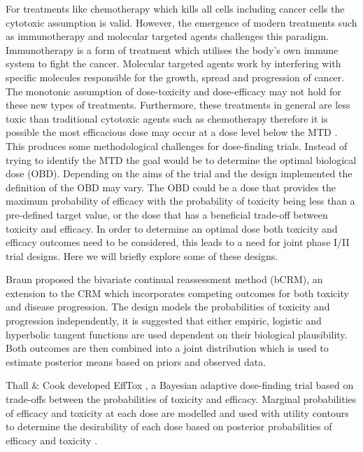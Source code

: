 For treatments like chemotherapy which kills all cells including cancer cells the cytotoxic assumption is valid. However, the emergence of modern treatments such as immunotherapy and molecular targeted agents challenges this paradigm. Immunotherapy is a form of treatment which utilises the body's own immune system to fight the cancer. Molecular targeted agents work by interfering with specific molecules responsible for the growth, spread and progression of cancer. The monotonic assumption of dose-toxicity and dose-efficacy may not hold for these new types of treatments. Furthermore, these treatments in general are less toxic than traditional cytotoxic agents such as chemotherapy therefore it is possible the most efficacious dose may occur at a dose level below the MTD \cite{ahnOptimalBiologicalDose2016}. This produces some methodological challenges for dose-finding trials. Instead of trying to identify the MTD the goal would be to determine the optimal biological dose (OBD). Depending on the aims of the trial and the design implemented the definition of the OBD may vary. The OBD could be a dose that provides the maximum probability of efficacy with the probability of toxicity being less than a pre-defined target value, or the dose that has a beneficial trade-off between toxicity and efficacy. In order to determine an optimal dose both toxicity and efficacy outcomes need to be considered, this leads to a need for joint phase \RN{1}/\RN{2} trial designs. Here we will briefly explore some of these designs. 

Braun \cite{braunBivariateContinualReassessment2002} proposed the bivariate continual reassessment method (bCRM), an extension to the CRM which incorporates competing outcomes for both toxicity and disease progression. The design models the probabilities of toxicity and progression independently, it is suggested that either empiric, logistic and hyperbolic tangent functions are used dependent on their biological plausibility. Both outcomes are then combined into a joint distribution which is used to estimate posterior means based on priors and observed data. 

Thall \& Cook \cite{thallDosefindingBasedEfficacytoxicity2004} developed EffTox , a Bayesian adaptive dose-finding trial based on trade-offs between the probabilities of toxicity and efficacy. Marginal probabilities of efficacy and toxicity at each dose are modelled and used with utility contours to determine the desirability of each dose based on posterior probabilities of efficacy and toxicity \cite{brockImplementingEffToxDosefinding2017}. 

